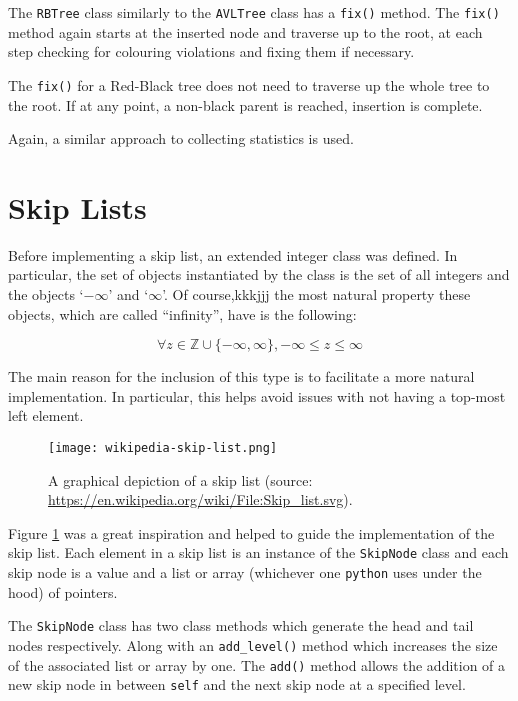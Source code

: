 \documentclass[article]{uom-coursework}
\begin{document}
The \texttt{RBTree} class similarly to the \texttt{AVLTree}
class has a \texttt{fix()} method. The \texttt{fix()} method
again starts at the inserted node and traverse up to the root,
at each step checking for colouring violations and fixing them
if necessary. 

\begin{note}
The \texttt{fix()} for a Red-Black tree does not need to
traverse up the whole tree to the root. If at any point, a
non-black parent is reached, insertion is complete.
\end{note}

Again, a similar approach to collecting statistics is used.

\section{Skip Lists}

Before implementing a skip list, an extended integer class was
defined. In particular, the set of objects instantiated by the
class is the set of all integers and the objects `$-\infty$' and
`$\infty$'. Of course,kkkjjj the most natural property these objects,
which are called ``infinity'', have is the following:

$$\forall z \in \mathbb{Z} \cup \{-\infty, \infty\}, -\infty \leq z \leq \infty$$

The main reason for the inclusion of this type is to facilitate
a more natural implementation. In particular, this helps avoid
issues with not having a top-most left element.

\begin{figure}[H]
\centering
\texttt{[image: wikipedia-skip-list.png]}
\caption{A graphical depiction of a skip list (source: \url{https://en.wikipedia.org/wiki/File:Skip_list.svg}).}
\label{fig:imageskiplist}
\end{figure}

Figure \ref{fig:imageskiplist} was a great inspiration and
helped to guide the implementation of the skip list. Each
element in a skip list is an instance of the \texttt{SkipNode}
class and each skip node is a value and a list or array
(whichever one \texttt{python} uses under the hood) of pointers.

The \texttt{SkipNode} class has two class methods which generate
the head and tail nodes respectively. Along with an
\texttt{add\_level()} method which increases the size of the
associated list or array by one. The \texttt{add()} method
allows the addition of a new skip node in between \texttt{self}
and the next skip node at a specified level.
\end{document}
